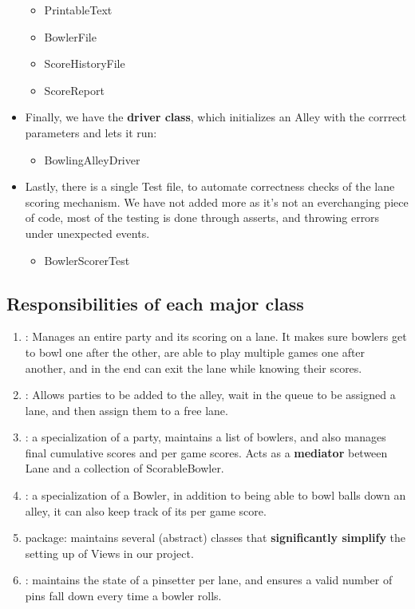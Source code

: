 \begin{itemize}
\begin{itemize}
              \item PrintableText
              \item BowlerFile
              \item ScoreHistoryFile
              \item ScoreReport
          \end{itemize}
    \item Finally, we have the \textbf{driver class}, which initializes an Alley with the corrrect parameters and lets it run:
          \begin{itemize}
              \item BowlingAlleyDriver
          \end{itemize}
    \item Lastly, there is a single Test file, to automate correctness checks of the lane scoring mechanism. We have not added more as it's not an everchanging piece of code, most of the testing is done through asserts, and throwing errors under unexpected events.
          \begin{itemize}
              \item BowlerScorerTest
          \end{itemize}
\end{itemize}

\subsection{Responsibilities of each major class}

\begin{enumerate}
    \item {}: Manages an entire party and its scoring on a lane. It makes sure bowlers get to bowl one after the other, are able to play multiple games one after another, and in the end can exit the lane while knowing their scores.
    \item {}: Allows parties to be added to the alley, wait in the queue to be assigned a lane, and then assign them to a free lane.
    \item {}: a specialization of a party, maintains a list of bowlers, and also manages final cumulative scores and per game scores. Acts as a \textbf{mediator} between Lane and a collection of ScorableBowler.
    \item {}: a specialization of a Bowler, in addition to being able to bowl balls down an alley, it can also keep track of its per game score.
    \item {} package: maintains several (abstract) classes that \textbf{significantly simplify} the setting up of Views in our project.
    \item {}: maintains the state of a pinsetter per lane, and ensures a valid number of pins fall down every time a bowler rolls.
\end{enumerate}

